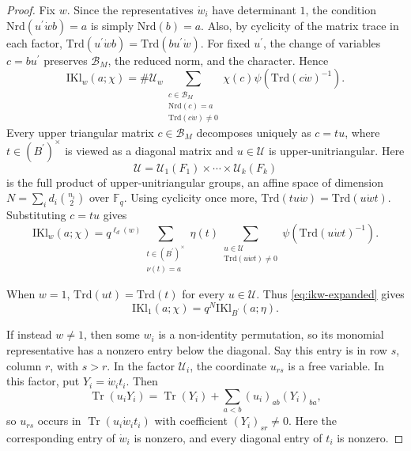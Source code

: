 \documentclass[11pt]{amsart}
\newcommand{\IKl}{\mathrm{IKl}}
\newcommand{\Nrd}{\mathrm{Nrd}}
\newcommand{\Trd}{\mathrm{Trd}}
\numberwithin{equation}{section}
\theoremstyle{remark}
\theoremstyle{plain}
\theoremstyle{definition}
\begin{document}
\begin{proof}
Fix \(w\).  Since the representatives \(\dot w_i\) have determinant
\(1\), the condition \(\Nrd(u^{\prime}\dot w b)=a\) is simply
\(\Nrd(b)=a\).  Also, by cyclicity of the matrix trace in each factor,
\(\Trd(u^{\prime}\dot w b)=\Trd(bu^{\prime}\dot w)\).  For fixed
\(u^{\prime}\), the change of variables \(c=bu^{\prime}\) preserves
\(\mathcal{B}_M\), the reduced norm, and the character.  Hence
\[
\IKl_w(a;\chi)
=
\#\mathcal{U}_w
\sum_{\substack{c\in \mathcal{B}_M\\
    \Nrd(c)=a\\ \Trd(c\dot w)\neq 0}}
\chi(c)\psi(\Trd(c\dot w)^{-1}).
\]
Every upper triangular matrix \(c\in \mathcal{B}_M\) decomposes uniquely
as \(c=tu\), where \(t\in (B^{\prime})^\times\) is viewed as a diagonal
matrix and \(u\in \mathcal{U}\) is upper-unitriangular.  Here
\[
\mathcal{U}=\mathcal{U}_1(F_1)\times\cdots\times \mathcal{U}_k(F_k)
\]
is the full product of upper-unitriangular groups, an affine space of
dimension \(N=\sum_i d_i\binom{n_i}{2}\) over \(\mathbb{F}_q\).  Using
cyclicity once more, \(\Trd(tu\dot w)=\Trd(u\dot w t)\).  Substituting
\(c=tu\) gives
\begin{equation}\label{eq:ikw-expanded}
\IKl_w(a;\chi)
=
q^{\ell_d(w)}
\sum_{\substack{t\in (B^{\prime})^\times\\ \nu(t)=a}}
\eta(t)
\sum_{\substack{u\in \mathcal{U}\\
    \Trd(u\dot w t)\neq 0}}
\psi(\Trd(u\dot w t)^{-1}).
\end{equation}

When \(w=1\), \(\Trd(ut)=\Trd(t)\) for every \(u\in \mathcal{U}\).
Thus \eqref{eq:ikw-expanded} gives
\begin{equation}
\label{eq:w1}
\IKl_1(a;\chi)
=
q^N\IKl_{B^{\prime}}(a;\eta).
\end{equation}

If instead \(w\neq 1\), then some \(w_i\) is a non-identity permutation,
so its monomial representative has a nonzero entry below the diagonal.
Say this entry is in row \(s\), column \(r\), with \(s>r\).  In the
factor \(\mathcal{U}_i\), the coordinate \(u_{rs}\) is a free variable.
In this factor, put \(Y_i=\dot w_i t_i\).  Then
\[
\operatorname{Tr}(u_iY_i)
=
\operatorname{Tr}(Y_i)+\sum_{a<b}(u_i)_{ab}(Y_i)_{ba},
\]
so \(u_{rs}\) occurs in \(\operatorname{Tr}(u_i\dot w_i t_i)\) with
coefficient \((Y_i)_{sr}\neq 0\).  Here the corresponding entry of
\(\dot w_i\) is nonzero, and every diagonal entry of \(t_i\) is nonzero.


\end{proof}
\end{document}
